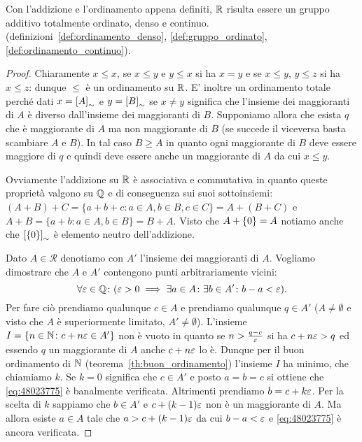 \begin{theorem}
  \label{th:reali_gruppo_continuo}%
Con l'addizione e l'ordinamento appena definiti, 
${\mathbb R}$ risulta essere un gruppo additivo totalmente ordinato, denso e continuo.
(definizioni~\ref{def:ordinamento_denso}, \ref{def:gruppo_ordinato}, \ref{def:ordinamento_continuo}).
\end{theorem}
\begin{proof}
  Chiaramente $x\le x$, se $x\le y$ e $y\le x$ si ha $x=y$ 
  e se $x\le y$, $y\le z$ si ha $x\le z$: dunque $\le$ è un ordinamento su ${\mathbb R}$.
  E' inoltre un ordinamento totale perché dati $x={\left[ A \right]}_\sim$ e 
  $y={\left[ B \right]}_\sim$ se $x\neq y$ significa che l'insieme dei maggioranti 
  di $A$ è diverso dall'insieme dei maggioranti di $B$. 
  Supponiamo allora che esista $q$ che è maggiorante di $A$ 
  ma non maggiorante di $B$ (se succede il viceversa basta scambiare $A$ e $B$).
  In tal caso $B\ge A$ in quanto ogni maggiorante di $B$ deve essere maggiore 
  di $q$ e quindi deve essere anche un maggiorante di $A$ da cui $x\le y$. 
  
  Ovviamente l'addizione su ${\mathbb R}$ è associativa e commutativa in quanto 
  queste proprietà valgono su ${\mathbb Q}$ e di conseguenza sui suoi sottoinsiemi:
  $(A+B)+C = \{ a+b+c\colon a\in A, b\in B, c\in C\} = A + (B+C)$ e 
  $A+B = \{a+b\colon a\in A, b\in B\} = B+A$.
  Visto che $A+{\left\{ 0 \right\}} = A$ notiamo anche che ${\left[ {\left\{ 0 \right\}} \right]}_\sim$ 
  è elemento neutro dell'addizione.
  
  Dato $A\in \mathcal R$ denotiamo con $A'$ l'insieme dei maggioranti di $A$.
  Vogliamo dimostrare che $A$ e $A'$ contengono punti arbitrariamente vicini:
  \begin{equation}\label{eq:48023775}
  \forall \varepsilon\in{\mathbb Q}\colon (\varepsilon >0 \implies \exists a \in A\colon \exists b\in A'\colon
  b-a < \varepsilon).
  \end{equation}
  Per fare ciò prendiamo qualunque $c\in A$ 
  e prendiamo qualunque $q\in A'$ 
  ($A\neq \emptyset$ e visto che $A$ è superiormente limitato, 
  $A'\neq \emptyset$).
  L'insieme $I={\left\{ n\in {\mathbb N} \colon c+n\varepsilon\in A' \right\}}$
  non è vuoto in quanto se $n>\frac{q-c}{\varepsilon}$ si ha $c+n\varepsilon>q$ ed essendo $q$ 
  un maggiorante di $A$ anche $c+n\varepsilon$ lo è.
  Dunque per il buon ordinamento di ${\mathbb N}$ (teorema~\ref{th:buon_ordinamento})
  l'insieme $I$ ha minimo, che chiamiamo $k$.
  Se $k=0$ significa che $c\in A'$ e posto $a=b=c$ si ottiene 
  che \eqref{eq:48023775} è banalmente verificata.
  Altrimenti prendiamo $b=c+k\varepsilon$.
  Per la scelta di $k$ sappiamo che $b\in A'$ e $c+(k-1)\varepsilon$ non è un maggiorante di 
  $A$. 
  Ma allora esiste $a\in A$ tale che $a>c+(k-1)\varepsilon$ da cui 
  $b-a < \varepsilon$ e \eqref{eq:48023775} è ancora verificata.
  

\end{proof}
